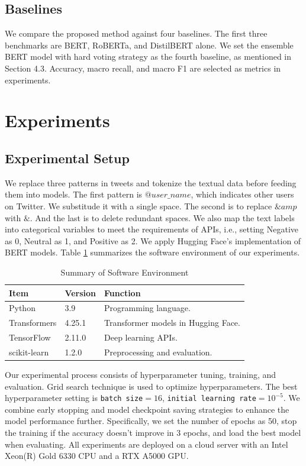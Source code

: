 \documentclass[runningheads]{llncs}
\begin{document}
\subsection{Baselines}
We compare the proposed method against four baselines. The first three benchmarks are BERT, RoBERTa, and DistilBERT alone. We set the ensemble BERT model with hard voting strategy as the fourth baseline, as mentioned in Section 4.3. Accuracy, macro recall, and macro F1 are selected as metrics in experiments.

\section{Experiments}
\subsection{Experimental Setup}
We replace three patterns in tweets and tokenize the textual data before feeding them into models. The first pattern is $@user\_name$, which indicates other users on Twitter. We substitude it with a single space. The second is to replace $\&amp$ with $\&$. And the last is to delete redundant spaces. We also map the text labels into categorical variables to meet the requirements of APIs, i.e., setting Negative as 0, Neutral as 1, and Positive as 2. We apply Hugging Face's implementation of BERT models. Table \ref{tab:exp-software} summarizes the software environment of our experiments. 

\begin{table}[!ht]
    \centering
    \caption{Summary of Software Environment}
    \label{tab:exp-software}
    \begin{tabular}{lll}
        \toprule
        \textbf{Item} & \textbf{Version} & \textbf{Function}\\
        \midrule
        Python & 3.9 & Programming language.\\
        Transformers & 4.25.1 & Transformer models in Hugging Face.\\
        TensorFlow & 2.11.0 & Deep learning APIs.\\
        scikit-learn & 1.2.0 & Preprocessing and evaluation.\\
        \bottomrule
    \end{tabular}
\end{table}

Our experimental process consists of hyperparameter tuning, training, and evaluation. Grid search technique is used to optimize hyperparameters. The best hyperparameter setting is \texttt{batch size}$= 16$, \texttt{initial learning rate}$ = 10^{-5}$. We combine early stopping and model checkpoint saving strategies to enhance the model performance further. Specifically, we set the number of epochs as 50, stop the training if the accuracy doesn't improve in 3 epochs, and load the best model when evaluating. All experiments are deployed on a cloud server with an Intel Xeon(R) Gold 6330 CPU and a RTX A5000 GPU.
\end{document}
